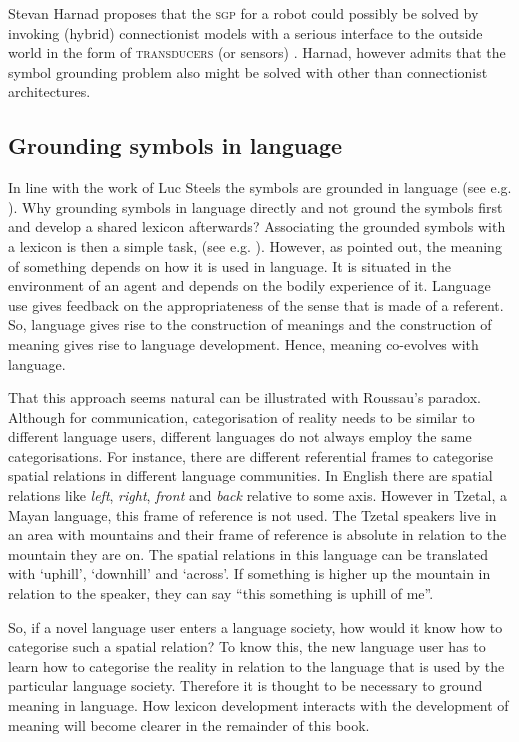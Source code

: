  Stevan Harnad proposes that the {\scshape sgp} for a robot could possibly be solved by invoking (hybrid) connectionist models with a serious interface to the outside world in the form of {\scshape transducers} (or sensors) \citep{harnad:1993}. Harnad, however admits that the symbol grounding problem also might be solved with other than connectionist architectures.

\subsection{Grounding symbols in language}

In line with the work of Luc Steels the symbols are grounded in language (see e.g. \citealt{steels:1997a,steels:2000}). Why grounding symbols in language directly and not ground the symbols first and develop a shared lexicon afterwards? Associating the grounded symbols with a lexicon is then a simple task, (see e.g. \citealt{oliphant:1997,steels:1996a}). However, as \citet{wittgenstein:1958} pointed out, the meaning of something depends on how it is used in language. It is situated in the environment of an agent and depends on the bodily experience of it. Language use gives feedback on the appropriateness of the sense that is made of a referent. So, language gives rise to the construction of meanings and the construction of meaning gives rise to language development. Hence, meaning co-evolves with language.

That this approach seems natural can be illustrated with Roussau's paradox. Although for communication, categorisation of reality needs to be similar to different language users, different languages do not always employ the same categorisations. For instance, there are different referential frames to categorise spatial relations in different language communities. In English there are spatial relations like {\em left}, {\em right}, {\em front} and {\em back} relative to some axis. However in Tzetal, a Mayan language, this frame of reference is not used. The Tzetal speakers live in an area with mountains and their frame of reference is absolute in relation to the mountain they are on. The spatial relations in this language can be translated with `uphill', `downhill' and `across'. If something is higher up the mountain in relation to the speaker, they can say ``this something is uphill of me''.

So, if a novel language user enters a language society, how would it know how to categorise such a spatial relation? To know this, the new language user has to learn how to categorise the reality in relation to the language that is used by the particular language society. Therefore it is thought to be necessary to ground meaning in language. How lexicon development interacts with the development of meaning will become clearer in the remainder of this book.


